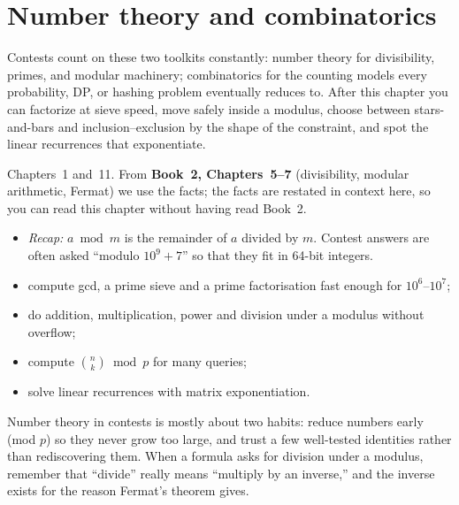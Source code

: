 \chapter{Number theory and combinatorics}\label{ch:ntcomb}

Contests count on these two toolkits constantly: number theory for
divisibility, primes, and modular machinery; combinatorics for the
counting models every probability, DP, or hashing problem eventually
reduces to. After this chapter you can factorize at sieve speed,
move safely inside a modulus, choose between stars-and-bars and
inclusion--exclusion by the shape of the constraint, and spot the
linear recurrences that exponentiate.

\begin{rulebox}
Chapters~1 and~11. From \textbf{Book~2, Chapters~5--7} (divisibility, modular arithmetic, Fermat) we use the facts; the facts are restated in context here, so you can read this chapter without having read Book~2.
\begin{itemize}
\item \emph{Recap:} $a \bmod m$ is the remainder of $a$ divided by $m$. Contest answers are often asked ``modulo $10^9+7$'' so that they fit in 64-bit integers.
\end{itemize}
\end{rulebox}
\begin{wins}
\begin{itemize}
\item compute gcd, a prime sieve and a prime factorisation fast enough for $10^6$--$10^7$;
\item do addition, multiplication, power and division under a modulus without overflow;
\item compute $\binom{n}{k}\bmod p$ for many queries;
\item solve linear recurrences with matrix exponentiation.
\end{itemize}
\end{wins}
\begin{principle}
Number theory in contests is mostly about two habits: reduce numbers early (mod $p$) so they never grow too large, and trust a few well-tested identities rather than rediscovering them. When a formula asks for division under a modulus, remember that ``divide'' really means ``multiply by an inverse,'' and the inverse exists for the reason Fermat's theorem gives.
\end{principle}

